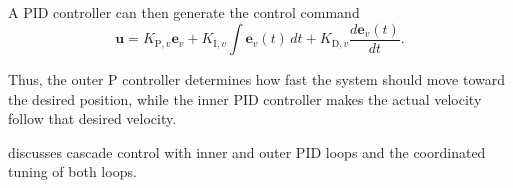 \documentclass[a4paper]{article}
\begin{document}
      A PID controller can then generate the control command
      \[
         \mathbf{u}
         =
         K_{\mathrm{P},v}\mathbf{e}_v
         +
         K_{\mathrm{I},v}\int \mathbf{e}_v(t)\,dt
         +
         K_{\mathrm{D},v}\frac{d\mathbf{e}_v(t)}{dt}.
      \]

      Thus, the outer P controller determines how fast the system should move toward the desired position, while the inner PID controller makes the actual velocity follow that desired velocity.

      \cite{lee-1998-pid-controller-tuning-for-cascade-control-systems} discusses cascade control with inner and outer PID loops and the coordinated tuning of both loops.

   
   
\end{document}
